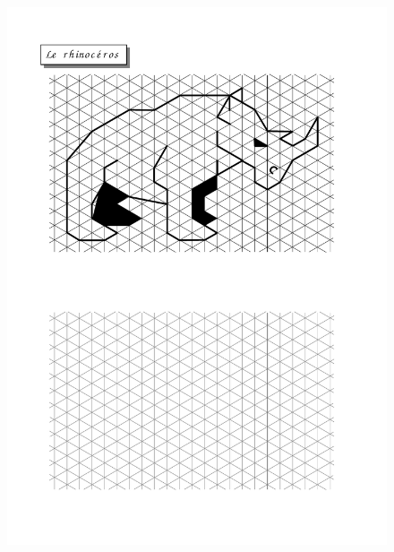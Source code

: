 \begin{figure}[H]
  \centering
  \includegraphics[width=\linewidth]{sources/pages/1.1.1/3-rhino.pdf}
  \caption{\label{elephant}}
\end{figure}


